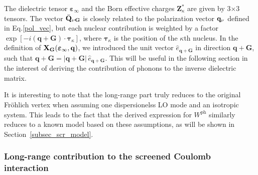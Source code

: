 %
The dielectric tensor $\boldsymbol{\varepsilon}_\infty$ and the Born effective charges $\mathbf{Z}^*_\kappa$ are given by 3$\times$3 tensors. The vector  $\bar{\mathbf{Q}}_{\nu\mathbf{G}}$ is closely related to the polarization vector $\mathbf{q}_{\nu}$ defined in Eq.\;\eqref{pol_vec}, but  each nuclear contribution is weighted by a factor $\exp[-i(\mathbf{q+G})\cdot\boldsymbol{\tau}_\kappa]$, where $\boldsymbol{\tau}_\kappa$ is the position of the $\kappa$th nucleus. In the definition of $\mathbf{X}_{\mathbf{G}}(\boldsymbol{\varepsilon}_\infty,\mathbf{q})$, we introduced the unit vector $\hat{e}_\mathbf{q+G}$ in direction $\mathbf{q+G}$, such that $\mathbf{q+G}=|\mathbf{q+G}|\,\hat{e}_\mathbf{q+G}$. This will be useful in the following section in the interest of deriving the contribution of phonons to the inverse dielectric matrix.\par 
It is interesting to note that the long-range part truly reduces to the original Fr\"ohlich vertex when assuming one dispersionelss LO mode and an isotropic system\cite{gius_verdi}. This leads to the fact that the derived expression for $W^\text{ph}$ similarly reduces to a known model based on these assumptions, as will be shown in Section~\ref{subsec_scr_model}.

\subsubsection{Long-range contribution to the screened Coulomb interaction}

